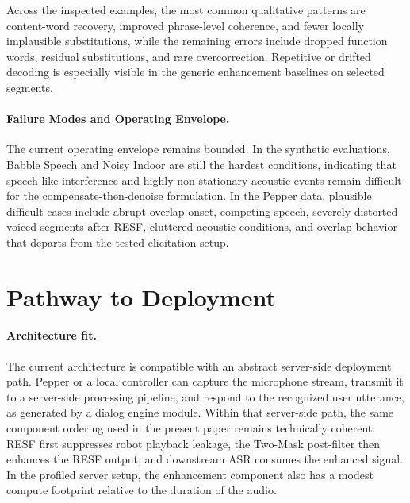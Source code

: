 \documentclass[manuscript,screen,review]{acmart}
\begin{document}
Across the inspected examples, the most common qualitative patterns are content-word recovery, improved phrase-level coherence, and fewer locally implausible substitutions, while the remaining errors include dropped function words, residual substitutions, and rare overcorrection. Repetitive or drifted decoding is especially visible in the generic enhancement baselines on selected segments. 

\paragraph{Failure Modes and Operating Envelope.}
The current operating envelope remains bounded. In the synthetic evaluations, Babble Speech and Noisy Indoor are still the hardest conditions, indicating that speech-like interference and highly non-stationary acoustic events remain difficult for the compensate-then-denoise formulation. In the Pepper data, plausible difficult cases include abrupt overlap onset, competing speech, severely distorted voiced segments after RESF, cluttered acoustic conditions, and overlap behavior that departs from the tested elicitation setup. 

\section{Pathway to Deployment}

\paragraph{Architecture fit.}
The current architecture is compatible with an abstract server-side deployment path. Pepper or a local controller can capture the microphone stream, transmit it to a server-side processing pipeline, and respond to the recognized user utterance, as generated by a dialog engine module. Within that server-side path, the same component ordering used in the present paper remains technically coherent: RESF first suppresses robot playback leakage, the Two-Mask post-filter then enhances the RESF output, and downstream ASR consumes the enhanced signal. In the profiled server setup, the enhancement component also has a modest compute footprint relative to the duration of the audio.
\end{document}
